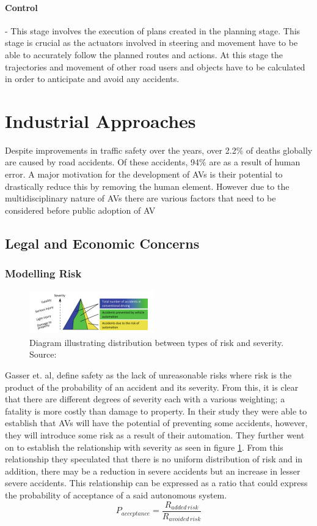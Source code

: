 \paragraph{Control} - This stage involves the execution of plans created in the planning stage. This stage is crucial as the actuators involved in steering and movement have to be able to accurately follow the planned routes and actions. At this stage the trajectories and movement of other road users and objects have to be calculated in order to anticipate and avoid any accidents. 
	

\section{Industrial Approaches}
Despite improvements in traffic safety over the years, over  2.2$\%$ of deaths globally are caused by road accidents. Of these accidents, 94$\%$ are as a result of human error. A major motivation for the development of AVs is their potential to drastically reduce this by removing the human element. However due to the multidisciplinary nature of AVs there are various factors that need to be considered before public adoption of AV


\subsection{Legal and Economic Concerns}
\subsubsection*{Modelling Risk}
\begin{figure}
	\centering
	\includegraphics[width=0.48\textwidth]{images/risk}
	\caption{Diagram illustrating distribution between types of risk and severity. Source:\cite{gasser2016fundamental}}
	\label{fig:riskrel}
\end{figure}
Gasser et. al\cite{gasser2016fundamental}, define safety as the lack of unreasonable risks where risk is the product of the probability of an accident and its severity. From this, it is clear that there are different degrees of severity each with a various weighting; a fatality is more costly than damage to property. In their study they were able to establish that AVs will have the potential of preventing some accidents, however, they will introduce some risk as a result of their automation. They further went on to establish the relationship with severity as seen in figure \ref{fig:riskrel}. From this relationship they speculated that there is no uniform distribution of risk and in addition, there may be a reduction in severe accidents but an increase in lesser severe accidents. 
This relationship can be expressed as a ratio that could express the probability of  acceptance of a said autonomous system. 
\begin{equation*}
P_{acceptance} = \frac{R_{added\, risk}}{R_{avoided\, risk}}
\end{equation*}

